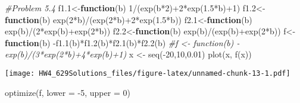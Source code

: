 \documentclass[
]{article}
\newenvironment{Shaded}{\begin{snugshade}}{\end{snugshade}}
\newcommand{\AttributeTok}[1]{\textcolor[rgb]{0.77,0.63,0.00}{#1}}
\newcommand{\CommentTok}[1]{\textcolor[rgb]{0.56,0.35,0.01}{\textit{#1}}}
\newcommand{\ControlFlowTok}[1]{\textcolor[rgb]{0.13,0.29,0.53}{\textbf{#1}}}
\newcommand{\DecValTok}[1]{\textcolor[rgb]{0.00,0.00,0.81}{#1}}
\newcommand{\FloatTok}[1]{\textcolor[rgb]{0.00,0.00,0.81}{#1}}
\newcommand{\FunctionTok}[1]{\textcolor[rgb]{0.00,0.00,0.00}{#1}}
\newcommand{\NormalTok}[1]{#1}
\newcommand{\OtherTok}[1]{\textcolor[rgb]{0.56,0.35,0.01}{#1}}
\newcommand{\SpecialCharTok}[1]{\textcolor[rgb]{0.00,0.00,0.00}{#1}}
\begin{document}
\begin{Shaded}
\begin{Highlighting}[]
\CommentTok{\#Problem 5.4}
\NormalTok{f1}\FloatTok{.1}\OtherTok{\textless{}{-}}\ControlFlowTok{function}\NormalTok{(b) }\DecValTok{1}\SpecialCharTok{/}\NormalTok{(}\FunctionTok{exp}\NormalTok{(b}\SpecialCharTok{*}\DecValTok{2}\NormalTok{)}\SpecialCharTok{+}\DecValTok{2}\SpecialCharTok{*}\FunctionTok{exp}\NormalTok{(}\FloatTok{1.5}\SpecialCharTok{*}\NormalTok{b)}\SpecialCharTok{+}\DecValTok{1}\NormalTok{)}
\NormalTok{f1}\FloatTok{.2}\OtherTok{\textless{}{-}}\ControlFlowTok{function}\NormalTok{(b) }\FunctionTok{exp}\NormalTok{(}\DecValTok{2}\SpecialCharTok{*}\NormalTok{b)}\SpecialCharTok{/}\NormalTok{(}\FunctionTok{exp}\NormalTok{(}\DecValTok{2}\SpecialCharTok{*}\NormalTok{b)}\SpecialCharTok{+}\DecValTok{2}\SpecialCharTok{*}\FunctionTok{exp}\NormalTok{(}\FloatTok{1.5}\SpecialCharTok{*}\NormalTok{b))}
\NormalTok{f2}\FloatTok{.1}\OtherTok{\textless{}{-}}\ControlFlowTok{function}\NormalTok{(b) }\FunctionTok{exp}\NormalTok{(b)}\SpecialCharTok{/}\NormalTok{(}\DecValTok{2}\SpecialCharTok{*}\FunctionTok{exp}\NormalTok{(b)}\SpecialCharTok{+}\FunctionTok{exp}\NormalTok{(}\DecValTok{2}\SpecialCharTok{*}\NormalTok{b))}
\NormalTok{f2}\FloatTok{.2}\OtherTok{\textless{}{-}}\ControlFlowTok{function}\NormalTok{(b) }\FunctionTok{exp}\NormalTok{(b)}\SpecialCharTok{/}\NormalTok{(}\FunctionTok{exp}\NormalTok{(b)}\SpecialCharTok{+}\FunctionTok{exp}\NormalTok{(}\DecValTok{2}\SpecialCharTok{*}\NormalTok{b))}
\NormalTok{f}\OtherTok{\textless{}{-}}\ControlFlowTok{function}\NormalTok{(b) }\SpecialCharTok{{-}}\FunctionTok{f1.1}\NormalTok{(b)}\SpecialCharTok{*}\FunctionTok{f1.2}\NormalTok{(b)}\SpecialCharTok{*}\FunctionTok{f2.1}\NormalTok{(b)}\SpecialCharTok{*}\FunctionTok{f2.2}\NormalTok{(b)}
\CommentTok{\#f \textless{}{-} function(b) {-}exp(b)/(3*exp(2*b)+4*exp(b)+1)}
\NormalTok{x }\OtherTok{\textless{}{-}} \FunctionTok{seq}\NormalTok{(}\SpecialCharTok{{-}}\DecValTok{20}\NormalTok{,}\DecValTok{10}\NormalTok{,}\FloatTok{0.01}\NormalTok{)}
\FunctionTok{plot}\NormalTok{(x, }\FunctionTok{f}\NormalTok{(x))   }
\end{Highlighting}
\end{Shaded}

\texttt{[image: HW4\_629Solutions\_files/figure-latex/unnamed-chunk-13-1.pdf]}

\begin{Shaded}
\begin{Highlighting}[]
\FunctionTok{optimize}\NormalTok{(f, }\AttributeTok{lower =} \SpecialCharTok{{-}}\DecValTok{5}\NormalTok{, }\AttributeTok{upper =} \DecValTok{0}\NormalTok{)}
\end{Highlighting}
\end{Shaded}
\end{document}
